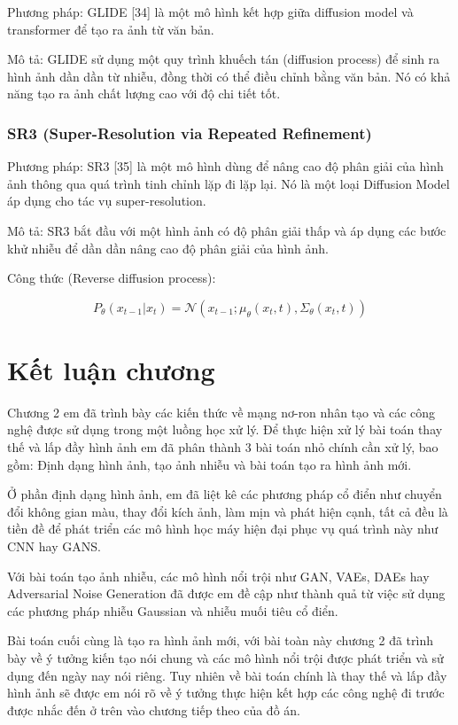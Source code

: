 \documentclass[12pt]{report}
\begin{document}
Phương pháp:  
GLIDE [34] là một mô hình kết hợp giữa diffusion model và transformer để tạo ra ảnh từ văn bản.

Mô tả:  
GLIDE sử dụng một quy trình khuếch tán (diffusion process) để sinh ra hình ảnh dần dần từ nhiễu, đồng thời có thể điều chỉnh bằng văn bản. Nó có khả năng tạo ra ảnh chất lượng cao với độ chi tiết tốt.

\subsubsection{SR3 (Super-Resolution via Repeated Refinement)}

Phương pháp:  
SR3 [35] là một mô hình dùng để nâng cao độ phân giải của hình ảnh thông qua quá trình tinh chỉnh lặp đi lặp lại. Nó là một loại Diffusion Model áp dụng cho tác vụ super-resolution.

Mô tả:  
SR3 bắt đầu với một hình ảnh có độ phân giải thấp và áp dụng các bước khử nhiễu để dần dần nâng cao độ phân giải của hình ảnh.

Công thức (Reverse diffusion process):

\[
P_\theta(x_{t-1} | x_t) = \mathcal{N}(x_{t-1}; \mu_\theta(x_t, t), \Sigma_\theta(x_t, t))
\]
\section{Kết luận chương}

Chương 2 em đã trình bày các kiến thức về mạng nơ-ron nhân tạo và các công nghệ được sử dụng trong một luồng học xử lý. Để thực hiện xử lý bài toán thay thế và lấp đầy hình ảnh em đã phân thành 3 bài toán nhỏ chính cần xử lý, bao gồm: Định dạng hình ảnh, tạo ảnh nhiễu và bài toán tạo ra hình ảnh mới.

Ở phần định dạng hình ảnh, em đã liệt kê các phương pháp cổ điển như chuyển đổi không gian màu, thay đổi kích ảnh, làm mịn và phát hiện cạnh, tất cả đều là tiền đề để phát triển các mô hình học máy hiện đại phục vụ quá trình này như CNN hay GANS.

Với bài toán tạo ảnh nhiễu, các mô hình nổi trội như GAN, VAEs, DAEs hay Adversarial Noise Generation đã được em đề cập như thành quả từ việc sử dụng các phương pháp nhiễu Gaussian và nhiễu muối tiêu cổ điển.

Bài toán cuối cùng là tạo ra hình ảnh mới, với bài toàn này chương 2 đã trình bày về ý tưởng kiến tạo nói chung và các mô hình nổi trội được phát triển và sử dụng đến ngày nay nói riêng. Tuy nhiên về bài toán chính là thay thế và lấp đầy hình ảnh sẽ được em nói rõ về ý tưởng thực hiện kết hợp các công nghệ đi trước được nhắc đến ở trên vào chương tiếp theo của đồ án.
\end{document}
